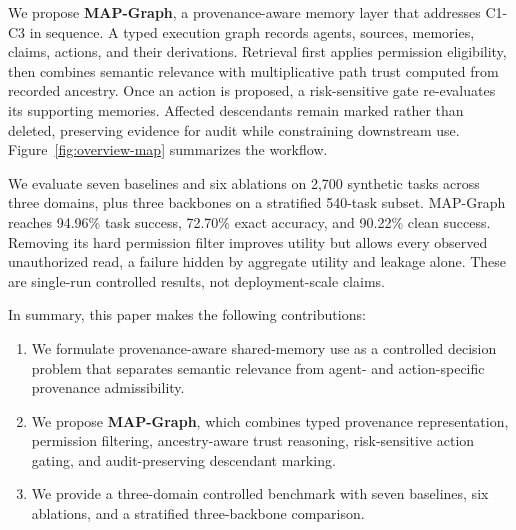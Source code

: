 \documentclass[letterpaper]{article} %
\begin{document}
We propose \textbf{MAP-Graph}, a provenance-aware memory layer that addresses C1-C3 in sequence.
A typed execution graph records agents, sources, memories, claims, actions, and their derivations. 
Retrieval first applies permission eligibility, then combines semantic relevance with multiplicative path trust computed from recorded ancestry. Once an action is proposed, a risk-sensitive gate re-evaluates its supporting memories. Affected descendants remain marked rather than deleted, preserving evidence for audit while constraining downstream use.
Figure~\ref{fig:overview-map} summarizes the workflow.

We evaluate seven baselines and six ablations on 2,700 synthetic tasks across three domains, plus three backbones on a stratified 540-task subset. MAP-Graph reaches 94.96\% task success, 72.70\% exact accuracy, and 90.22\% clean success. Removing its hard permission filter improves utility but allows every observed unauthorized read, a failure hidden by aggregate utility and leakage alone. These are single-run controlled results, not deployment-scale claims.


In summary, this paper makes the following contributions:
\begin{enumerate}
    \item We formulate provenance-aware shared-memory use as a controlled decision problem that separates semantic relevance from agent- and action-specific provenance admissibility.

    \item We propose \textbf{MAP-Graph}, which combines typed provenance representation, permission filtering, ancestry-aware trust reasoning, risk-sensitive action gating, and audit-preserving descendant marking.

    \item We provide a three-domain controlled benchmark with seven baselines, six ablations, and a stratified three-backbone comparison.
\end{enumerate}
\end{document}
